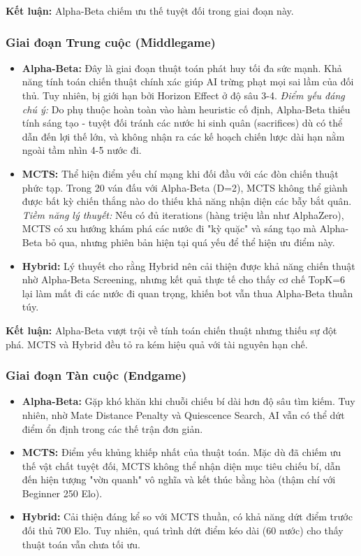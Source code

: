 \textbf{Kết luận:} Alpha-Beta chiếm ưu thế tuyệt đối trong giai đoạn này.

\subsubsection{Giai đoạn Trung cuộc (Middlegame)}

\begin{itemize}
    \item \textbf{Alpha-Beta:} Đây là giai đoạn thuật toán phát huy tối đa sức mạnh. Khả năng tính toán chiến thuật chính xác giúp AI trừng phạt mọi sai lầm của đối thủ. Tuy nhiên, bị giới hạn bởi Horizon Effect ở độ sâu 3-4. \textit{Điểm yếu đáng chú ý:} Do phụ thuộc hoàn toàn vào hàm heuristic cố định, Alpha-Beta thiếu tính sáng tạo - tuyệt đối tránh các nước hi sinh quân (sacrifices) dù có thể dẫn đến lợi thế lớn, và không nhận ra các kế hoạch chiến lược dài hạn nằm ngoài tầm nhìn 4-5 nước đi.
    \item \textbf{MCTS:} Thể hiện điểm yếu chí mạng khi đối đầu với các đòn chiến thuật phức tạp. Trong 20 ván đấu với Alpha-Beta (D=2), MCTS không thể giành được bất kỳ chiến thắng nào do thiếu khả năng nhận diện các bẫy bắt quân. \textit{Tiềm năng lý thuyết:} Nếu có đủ iterations (hàng triệu lần như AlphaZero), MCTS có xu hướng khám phá các nước đi "kỳ quặc" và sáng tạo mà Alpha-Beta bỏ qua, nhưng phiên bản hiện tại quá yếu để thể hiện ưu điểm này.
    \item \textbf{Hybrid:} Lý thuyết cho rằng Hybrid nên cải thiện được khả năng chiến thuật nhờ Alpha-Beta Screening, nhưng kết quả thực tế cho thấy cơ chế TopK=6 lại làm mất đi các nước đi quan trọng, khiến bot vẫn thua Alpha-Beta thuần túy.
\end{itemize}

\textbf{Kết luận:} Alpha-Beta vượt trội về tính toán chiến thuật nhưng thiếu sự đột phá. MCTS và Hybrid đều tỏ ra kém hiệu quả với tài nguyên hạn chế.

\subsubsection{Giai đoạn Tàn cuộc (Endgame)}

\begin{itemize}
    \item \textbf{Alpha-Beta:} Gặp khó khăn khi chuỗi chiếu bí dài hơn độ sâu tìm kiếm. Tuy nhiên, nhờ Mate Distance Penalty và Quiescence Search, AI vẫn có thể dứt điểm ổn định trong các thế trận đơn giản.
    \item \textbf{MCTS:} Điểm yếu khủng khiếp nhất của thuật toán. Mặc dù đã chiếm ưu thế vật chất tuyệt đối, MCTS không thể nhận diện mục tiêu chiếu bí, dẫn đến hiện tượng "vờn quanh" vô nghĩa và kết thúc bằng hòa (thậm chí với Beginner 250 Elo).
    \item \textbf{Hybrid:} Cải thiện đáng kể so với MCTS thuần, có khả năng dứt điểm trước đối thủ 700 Elo. Tuy nhiên, quá trình dứt điểm kéo dài (60 nước) cho thấy thuật toán vẫn chưa tối ưu.
\end{itemize}


